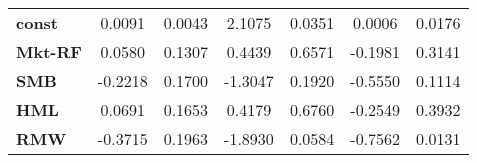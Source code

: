 \begin{center}
\begin{tabular}{lcccccc}
\midrule
\textbf{const}  &       0.0091       &       0.0043       &      2.1075     &      0.0351      &       0.0006      &       0.0176       \\
\textbf{Mkt-RF} &       0.0580       &       0.1307       &      0.4439     &      0.6571      &      -0.1981      &       0.3141       \\
\textbf{SMB}    &      -0.2218       &       0.1700       &     -1.3047     &      0.1920      &      -0.5550      &       0.1114       \\
\textbf{HML}    &       0.0691       &       0.1653       &      0.4179     &      0.6760      &      -0.2549      &       0.3932       \\
\textbf{RMW}    &      -0.3715       &       0.1963       &     -1.8930     &      0.0584      &      -0.7562      &       0.0131       \\
\bottomrule
\end{tabular}
\end{center}
